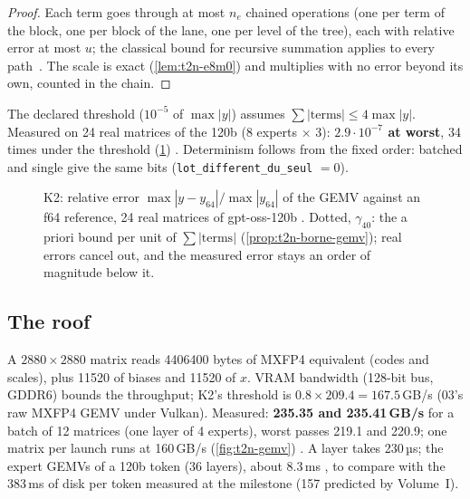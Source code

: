 \begin{proof}
Each term goes through at most $n_e$ chained operations (one per term of the block, one per block of the lane, one per level of the tree), each with relative error at most $u$; the classical bound for recursive summation applies to every path~\cite{higham2002}. The scale is exact (\cref{lem:t2n-e8m0}) and multiplies with no error beyond its own, counted in the chain.
\end{proof}

The declared threshold ($10^{-5}$ of $\max|y|$) assumes $\sum|\text{terms}| \le 4 \max|y|$. Measured on 24 real matrices of the 120b (8 experts $\times$ 3): \textbf{$2.9\cdot10^{-7}$ at worst}, 34 times under the threshold (\cref{fig:t2n-ecarts}) \mes. Determinism follows from the fixed order: batched and single give the same bits (\texttt{lot\_\allowbreak different\_\allowbreak du\_\allowbreak seul} $= 0$).

\begin{figure}[!htbp]
\centering
\GrapheNoyEcarts
\caption[K2: GEMV error on real weights]{K2: relative error $\max|y - y_{64}| / \max|y_{64}|$ of the GEMV against an f64 reference, 24 real matrices of gpt-oss-120b \mes. Dotted, $\gamma_{40}$: the a priori bound per unit of $\sum|\text{terms}|$ (\cref{prop:t2n-borne-gemv}); real errors cancel out, and the measured error stays an order of magnitude below it.}
\label{fig:t2n-ecarts}
\end{figure}

\subsection{The roof}

A $\num{2880} \times \num{2880}$ matrix reads \num{4406400} bytes of MXFP4 equivalent (codes and scales), plus \num{11520} of biases and \num{11520} of $x$. VRAM bandwidth (128-bit bus, GDDR6) bounds the throughput; K2's threshold is $0.8 \times 209.4 = 167.5$\,GB/s (03's raw MXFP4 GEMV under Vulkan). Measured: \textbf{235.35 and 235.41\,GB/s} for a batch of 12 matrices (one layer of 4 experts), worst passes 219.1 and 220.9; one matrix per launch runs at 160\,GB/s (\cref{fig:t2n-gemv}) \mes. A layer takes 230\,µs; the expert GEMVs of a 120b token (36 layers), about 8.3\,ms \calc, to compare with the 383\,ms of disk per token measured at the milestone (157 predicted by Volume~I).

